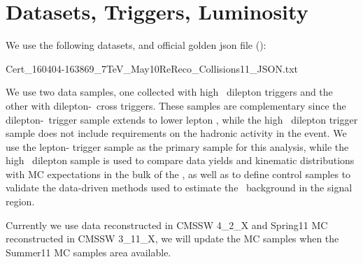 \section{Datasets, Triggers, Luminosity}
\label{sec:datasets}

We use the following datasets, and official golden json file (\lumi):

Cert\_160404-163869\_7TeV\_May10ReReco\_Collisions11\_JSON.txt

We use two data samples, one collected with high \pt\ dilepton triggers and the other 
with dilepton-\Ht\ cross triggers. These samples are complementary since the dilepton-\Ht\
trigger sample extends to lower lepton \pt, while the high \pt\ dilepton trigger sample 
does not include requirements on the hadronic activity in the event. We use the lepton-\Ht
trigger sample as the primary sample for this analysis, while the high \pt\ dilepton sample
is used to compare data yields and kinematic distributions with MC expectations in the bulk
of the \ttbar, as well as to define control samples to validate the data-driven methods used 
to estimate the \ttbar\ background in the signal region.

Currently we use data reconstructed in CMSSW 4\_2\_X and Spring11 MC reconstructed in CMSSW 3\_11\_X,
we will update the MC samples when the Summer11 MC samples area available.


